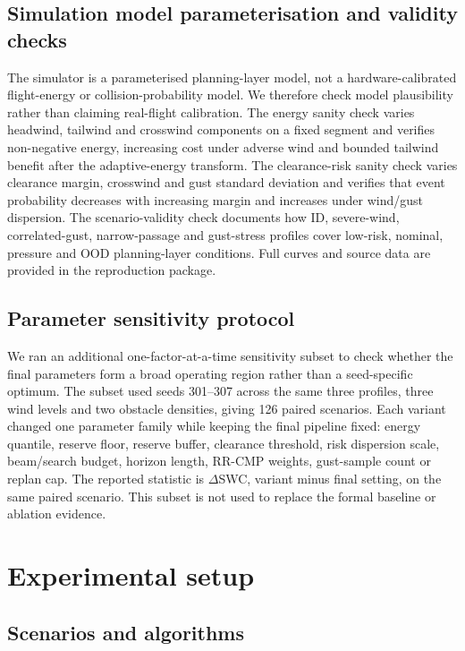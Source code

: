 \documentclass[preprint,12pt]{elsarticle}
\begin{document}
\subsection{Simulation model parameterisation and validity checks}

The simulator is a parameterised planning-layer model, not a hardware-calibrated flight-energy or collision-probability model. We therefore check model plausibility rather than claiming real-flight calibration. The energy sanity check varies headwind, tailwind and crosswind components on a fixed segment and verifies non-negative energy, increasing cost under adverse wind and bounded tailwind benefit after the adaptive-energy transform. The clearance-risk sanity check varies clearance margin, crosswind and gust standard deviation and verifies that event probability decreases with increasing margin and increases under wind/gust dispersion. The scenario-validity check documents how ID, severe-wind, correlated-gust, narrow-passage and gust-stress profiles cover low-risk, nominal, pressure and OOD planning-layer conditions. Full curves and source data are provided in the reproduction package.

\subsection{Parameter sensitivity protocol}

We ran an additional one-factor-at-a-time sensitivity subset to check whether the final parameters form a broad operating region rather than a seed-specific optimum. The subset used seeds 301--307 across the same three profiles, three wind levels and two obstacle densities, giving 126 paired scenarios. Each variant changed one parameter family while keeping the final pipeline fixed: energy quantile, reserve floor, reserve buffer, clearance threshold, risk dispersion scale, beam/search budget, horizon length, RR-CMP weights, gust-sample count or replan cap. The reported statistic is $\Delta$SWC, variant minus final setting, on the same paired scenario. This subset is not used to replace the formal baseline or ablation evidence.



\FloatBarrier

\section{Experimental setup}

\subsection{Scenarios and algorithms}
\end{document}
